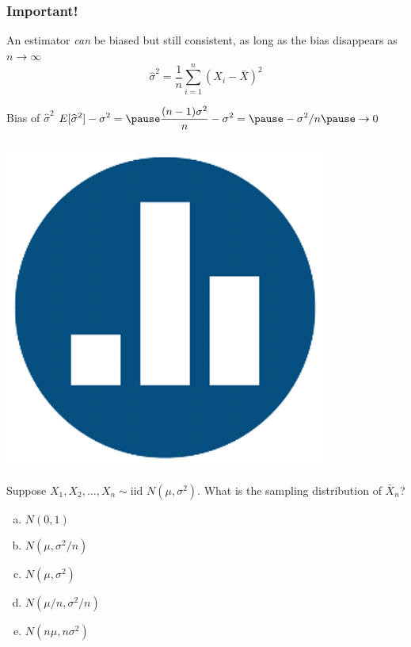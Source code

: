 \documentclass[handout]{beamer}
\begin{document}
\begin{frame}
\frametitle{Important! }

An estimator \emph{can} be biased but still consistent, as long as the bias disappears as $n \rightarrow \infty$
$$\widehat{\sigma}^2 = \frac{1}{n}\sum_{i=1}^n \left(X_i - \bar{X}\right)^2$$


\begin{block}{Bias of $\widehat{\sigma}^2$}
\vspace{0.75em}
$\displaystyle E[\widehat{\sigma}^2 ] - \sigma^2 = \pause \frac{(n-1)\sigma^2}{n}  - \sigma^2 =  \pause -\sigma^2/n \pause \rightarrow 0$
\end{block}


\end{frame}




\begin{frame}
\frametitle{\includegraphics[scale = 0.05]{./images/clicker}}
Suppose $X_1, X_2, \hdots, X_n \sim \mbox{iid } N(\mu,\sigma^2)$. What is the sampling distribution of $\bar{X}_n$?

\begin{enumerate}[(a)]
\item $N(0,1)$
\item $N(\mu, \sigma^2/n)$
\item $N(\mu, \sigma^2)$
\item $N(\mu/n, \sigma^2/n)$
\item $N(n\mu, n\sigma^2)$
\end{enumerate}

\end{frame}
\end{document}
